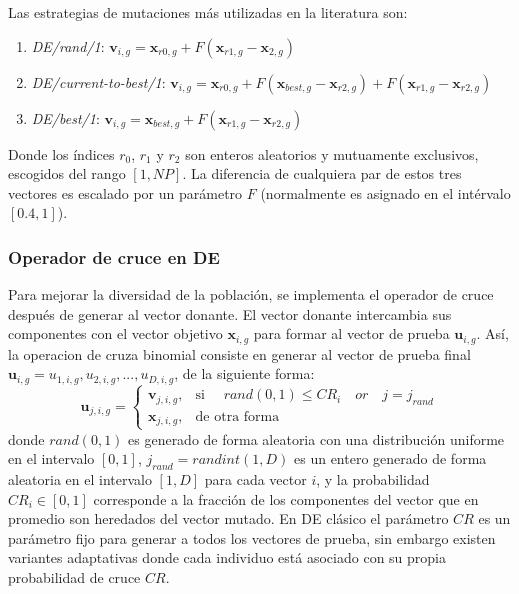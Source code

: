 %
Las estrategias de mutaciones más utilizadas en la literatura son:
\begin{enumerate}
\item \textit{DE/rand/1}: $\boldsymbol{v}_{i,g} = \boldsymbol{x}_{r0,g} + F(\boldsymbol{x}_{r1,g} - \boldsymbol{x}_{2,g})$
\item \textit{DE/current-to-best/1}: $\boldsymbol{v}_{i,g} = \boldsymbol{x}_{r0,g} + F(\boldsymbol{x}_{best, g} - \boldsymbol{x}_{r2,g})  + F(\boldsymbol{x}_{r1,g} - \boldsymbol{x}_{r2,g})$
\item \textit{DE/best/1}: $\boldsymbol{v}_{i,g} = \boldsymbol{x}_{best, g} + F(\boldsymbol{x}_{r1,g} - \boldsymbol{x}_{r2,g})$
\end{enumerate}

%
Donde los índices $r_0$, $r_1$ y $r_2$ son enteros aleatorios y mutuamente exclusivos, escogidos del rango $[1, NP]$.
%
La diferencia de cualquiera par de estos tres vectores es escalado por un parámetro $F$ (normalmente es asignado en el intérvalo $[0.4, 1]$).
%

\subsubsection*{Operador de cruce en DE}

Para mejorar la diversidad de la población, se implementa el operador de cruce después de generar al vector donante.
%
El vector donante intercambia sus componentes con el vector objetivo $\boldsymbol{x}_{i,g}$ para formar al vector de prueba $\boldsymbol{u}_{i,g}$.
%
Así, la operacion de cruza binomial consiste en generar al vector de prueba final $\boldsymbol{u}_{i,g} = u_{1,i,g},  u_{2,i,g},... , u_{D,i,g}$, de la siguiente forma:
\[
   \boldsymbol{u}_{j, i, g} = 
\begin{cases}
      		\boldsymbol{v}_{j,i,g},& \text{si } \quad rand(0, 1) \leq CR_i \quad or \quad j=j_{rand}\\
    		\boldsymbol{x}_{j,i,g},& \text{de otra forma}
\end{cases}
\]
donde  $rand(0, 1)$ es generado de forma aleatoria con una distribución uniforme en el intervalo $[0, 1]$, $j_{rand} = randint(1, D)$ es un entero generado de forma aleatoria en el intervalo $[1, D]$ para cada vector $i$, y la probabilidad $CR_i \in [0,1]$ corresponde a la fracción de los componentes del vector que en promedio son heredados del vector mutado.
%
En DE clásico el parámetro $CR$ es un parámetro fijo para generar a todos los vectores de prueba, sin embargo existen variantes adaptativas donde cada individuo está asociado con su propia probabilidad de cruce $CR$.

